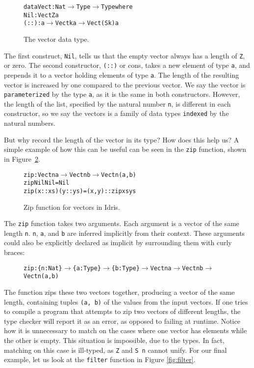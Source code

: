 \begin{figure}
\begin{alltt}
data Vect : Nat \(\to\) Type \(\to\) Type where
  Nil  : Vect Z a
  (::) : a \(\to\) Vect k a \(\to\) Vect (S k) a
\end{alltt}
\caption{The vector data type.}
\label{fig:vect}
\end{figure}

The first construct, \texttt{Nil}, tells us that the empty vector always has a length of \texttt{Z}, or zero. The second constructor, \texttt{(::)} or cons, takes a new element of type \texttt{a}, and prepends it to a vector holding elements of type \texttt{a}. The length of the resulting vector is increased by one compared to the previous vector. We say the vector is \texttt{parameterized} by the type \texttt{a}, as it is the same in both constructors. However, the length of the list, specified by the natural number \texttt{n}, is different in each constructor, so we say the vectors is a family of data types \texttt{indexed} by the natural numbers.

But why record the length of the vector in its type? How does this help us? A simple example of how this can be useful can be seen in the \texttt{zip} function, shown in Figure~\ref{fig:zip}.

\begin{figure}
\begin{alltt}
zip : Vect n a \(\to\) Vect n b \(\to\) Vect n (a, b)
zip Nil       Nil       = Nil
zip (x :: xs) (y :: ys) = (x, y) :: zip xs ys
\end{alltt}
\caption{Zip function for vectors in Idris.}
\label{fig:zip}
\end{figure}

The \texttt{zip} function takes two arguments. Each argument is a vector of the same length \texttt{n}. \texttt{n}, \texttt{a}, and \texttt{b} are inferred implicitly from their context. These arguments could also be explicitly declared as implicit by surrounding them with curly braces:

\begin{figure}
\begin{alltt}
zip : \{n: Nat\} \(\to\) \{a: Type\} \(\to\) \{b: Type\} \(\to\) Vect n a \(\to\) Vect n b \(\to\) Vect n (a, b)
\end{alltt}
\end{figure}

The function zips these two vectors together, producing a vector of the same length, containing tuples \texttt{(a, b)} of the values from the input vectors. If one tries to compile a program that attempts to zip two vectors of different lengths, the type checker will report it as an error, as opposed to failing at runtime. Notice how it is unnecessary to match on the cases where one vector has elements while the other is empty. This situation is impossible, due to the types. In fact, matching on this case is ill-typed, as \texttt{Z} and \texttt{S~n} cannot unify. For our final example, let us look at the \texttt{filter} function in Figure \ref{fig:filter}.

